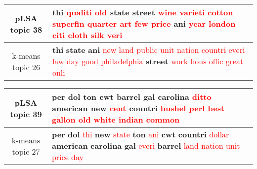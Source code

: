 \begin{center}\begin{tabularx}{\textwidth} {
  | c | >{\raggedright\arraybackslash}X | } \hline 
pLSA topic 38 & \textbf{thi} \textcolor{red}{qualiti} \textcolor{red}{old} \textbf{state} \textbf{street} \textcolor{red}{wine} \textcolor{red}{varieti} \textcolor{red}{cotton} \textcolor{red}{superfin} \textcolor{red}{quarter} \textcolor{red}{art} \textcolor{red}{few} \textcolor{red}{price} \textbf{ani} \textcolor{red}{year} \textcolor{red}{london} \textcolor{red}{citi} \textcolor{red}{cloth} \textcolor{red}{silk} \textcolor{red}{veri} \\ \hline 
k-means topic 26 & \textbf{thi} \textbf{state} \textbf{ani} \textcolor{red}{new} \textcolor{red}{land} \textcolor{red}{public} \textcolor{red}{unit} \textcolor{red}{nation} \textcolor{red}{countri} \textcolor{red}{everi} \textcolor{red}{law} \textcolor{red}{day} \textcolor{red}{good} \textcolor{red}{philadelphia} \textbf{street} \textcolor{red}{work} \textcolor{red}{hous} \textcolor{red}{offic} \textcolor{red}{great} \textcolor{red}{onli} \\ \hline 
\end{tabularx}

\end{center}

\begin{center}\begin{tabularx}{\textwidth} {
  | c | >{\raggedright\arraybackslash}X | } \hline 
pLSA topic 39 & \textbf{per} \textbf{dol} \textbf{ton} \textbf{cwt} \textbf{barrel} \textbf{gal} \textbf{carolina} \textcolor{red}{ditto} \textbf{american} \textbf{new} \textcolor{red}{cent} \textbf{countri} \textcolor{red}{bushel} \textcolor{red}{perl} \textcolor{red}{best} \textcolor{red}{gallon} \textcolor{red}{old} \textcolor{red}{white} \textcolor{red}{indian} \textcolor{red}{common} \\ \hline 
k-means topic 27 & \textbf{per} \textbf{dol} \textcolor{red}{thi} \textbf{new} \textcolor{red}{state} \textbf{ton} \textcolor{red}{ani} \textbf{cwt} \textbf{countri} \textcolor{red}{dollar} \textbf{american} \textbf{carolina} \textbf{gal} \textcolor{red}{everi} \textbf{barrel} \textcolor{red}{land} \textcolor{red}{nation} \textcolor{red}{unit} \textcolor{red}{price} \textcolor{red}{day} \\ \hline 
\end{tabularx}

\end{center}

